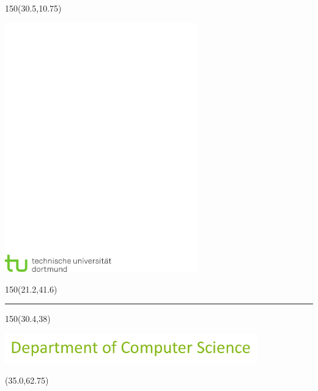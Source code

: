 
\begin{titlepage}

\begin{textblock}{150}(30.5,10.75)%
\raggedright
\includegraphics[width=83.25mm]{images/tud_logo_cmyk.pdf}%
\end{textblock}

\begin{textblock}{150}(21.2,41.6)%
\raggedright\sffamily%
{\color{red}\rule{5mm}{5mm}}
\end{textblock}

\begin{textblock}{150}(30.4,38)%
\raggedright
\includegraphics[height=13mm]{images/fi_text.pdf}
\end{textblock}

\begin{textblock}{89}(35.0,62.75)%
\begin{minipage}{80mm}
	\vfill
	\begin{center}
	\fontsize{24pt}{24pt} \sffamily
	\Thesistyp
	
	\vspace{1cm}
	\begin{onehalfspace}
    \fontsize{18pt}{18pt}
    \sffamily \Thesistitle
    \end{onehalfspace}
	

\end{center}
\end{minipage}
\end{textblock}
\end{titlepage}
